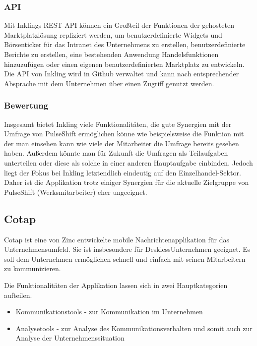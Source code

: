 \subsubsection{API}

Mit Inklings REST-API können ein Großteil der Funktionen der gehosteten Marktplatzlösung repliziert werden, um benutzerdefinierte Widgets und Börsenticker für das Intranet des Unternehmens zu erstellen, benutzerdefinierte Berichte zu erstellen, eine bestehenden Anwendung Handelsfunktionen hinzuzufügen oder einen eigenen benutzerdefinierten Marktplatz zu entwickeln. Die API von Inkling wird in Github verwaltet und kann nach entsprechender Absprache mit dem Unternehmen über einen Zugriff genutzt werden.

\subsubsection{Bewertung}

Insgesamt bietet Inkling viele Funktionalitäten, die gute Synergien mit der Umfrage von PulseShift ermöglichen könne wie beispielsweise die Funktion mit der man einsehen kann wie viele der Mitarbeiter die Umfrage bereits gesehen haben. Außerdem könnte man für Zukunft die Umfragen als Teilaufgaben unterteilen oder diese als solche in einer anderen Hauptaufgabe einbinden.
Jedoch liegt der Fokus bei Inkling letztendlich eindeutig auf den Einzelhandel-Sektor. Daher ist die Applikation trotz einiger Synergien für die aktuelle Zielgruppe von PulseShift (Werksmitarbeiter) eher ungeeignet.



\subsection{Cotap}
Cotap ist eine von Zinc entwickelte mobile Nachrichtenapplikation für das Unternehmensumfeld. Sie ist insbesondere für \glqq Deskless\grqq Unternehmen geeignet. Es soll dem Unternehmen ermöglichen schnell und einfach mit seinen Mitarbeitern zu kommunizieren. 

Die Funktionalitäten der Applikation lassen sich in zwei Hauptkategorien aufteilen. 

\begin{itemize}
\item Kommunikationstools - zur Kommunikation im Unternehmen 
\item Analysetools - zur Analyse des Kommunikationsverhalten und somit auch zur Analyse der Unternehmenssituation
\end{itemize}


